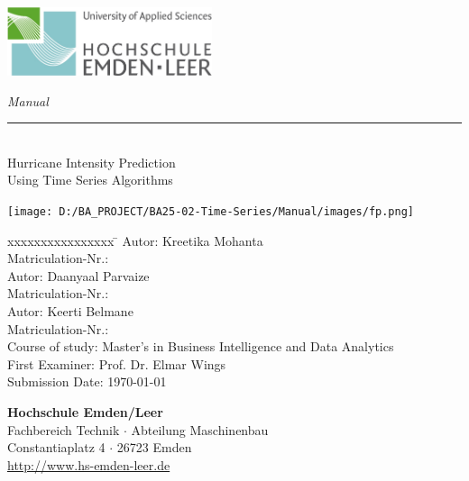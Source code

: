 \begin{titlepage}
	
	\begin{flushleft}
		\includegraphics[width=6cm]{General/technik.jpg}
	\end{flushleft}
	
	\vspace{-1.8cm}
	\begin{flushright}
		\LARGE \textsl{Manual}\\
		\rule{0.6\textwidth}{0.4pt} ~\\
		\vspace{0.3cm}
		\textsf{\LARGE Hurricane Intensity Prediction}\\
		\textsf{\LARGE Using Time Series Algorithms}
	\end{flushright}
	
	\vspace{0.3cm}
	\begin{center}
		\texttt{[image: D:/BA\_PROJECT/BA25-02-Time-Series/Manual/images/fp.png]}
	\end{center}
	
	\vspace{0.3cm}
	\large
	\hspace{3.2cm}
	\begin{tabbing}
		xxxxxxxxxxxxxxxx \= \kill
		Autor: \> Kreetika Mohanta\\
		Matriculation-Nr.:  \\
		Autor: \> Daanyaal Parvaize\\
		Matriculation-Nr.:  \\
		Autor: \> Keerti Belmane \\
		Matriculation-Nr.:  \\
		Course of study: \> Master's in Business Intelligence and Data Analytics \\[0.3cm]
		First Examiner: \> Prof. Dr. Elmar Wings \\
		Submission Date: \> \today \\
	\end{tabbing}
	
	\vfill %
	
	\small
	\begin{center}
		\textbf{\Large Hochschule Emden/Leer} \\[0.1cm]
		Fachbereich Technik $\cdot$
		Abteilung Maschinenbau \\[0.1cm]
		Constantiaplatz 4 $\cdot$
		26723 Emden \\[0.1cm]
		\url{http://www.hs-emden-leer.de}
	\end{center}
	
\end{titlepage}
